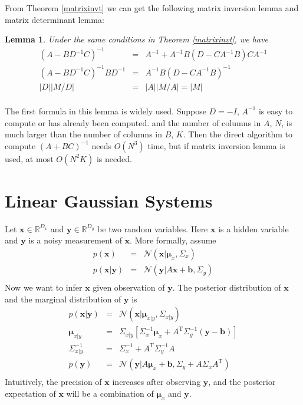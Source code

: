 \documentclass[openany]{book}
\newtheorem{lemma}{Lemma}[chapter]
\begin{document}
From Theorem \ref{matrixinvt} we can get the following matrix inversion lemma and matrix determinant lemma:
\begin{lemma}\label{matrixinvl}
Under the same conditions in Theorem \ref{matrixinvt}, we have
\begin{equation}
\begin{array}{rcl}
(A-BD^{-1}C)^{-1} & = & A^{-1}+A^{-1}B(D-CA^{-1}B)CA^{-1} \\
(A-BD^{-1}C)^{-1}BD^{-1} & = & A^{-1}B(D-CA^{-1}B)^{-1} \\
|D||M/D| & = & |A||M/A|=|M| \\
\end{array}
\end{equation}
\end{lemma}
The first formula in this lemma is widely used. Suppose $D=-I$, $A^{-1}$ is easy to compute or has already been computed. and the number of columns in $A$, $N$, is much larger than the number of columns in $B$, $K$. Then the direct algorithm to compute $(A+BC)^{-1}$ needs $O(N^3)$ time, but if matrix inversion lemma is used, at most $O(N^2K)$ is needed.

\section{Linear Gaussian Systems}
Let $\mathbf{x}\in\mathbb{R}^{D_x}$ and $\mathbf{y}\in\mathbb{R}^{D_y}$ be two random variables. Here $\mathbf{x}$ is a hidden variable and $\mathbf{y}$ is a noisy measurement of $\mathbf{x}$. More formally, assume
\begin{equation}\label{linGauss}
\begin{array}{rcl}
p(\mathbf{x}) & = & \mathcal{N}(\mathbf{x}|\boldsymbol{\mu}_x,\Sigma_x) \\
p(\mathbf{x}|\mathbf{y}) & = & \mathcal{N}(\mathbf{y}|A\mathbf{x}+\mathbf{b}, \Sigma_y) \\
\end{array}
\end{equation}
Now we want to infer $\mathbf{x}$ given observation of $\mathbf{y}$. The posterior distribution of $\mathbf{x}$ and the marginal distribution of $\mathbf{y}$ is
\begin{equation}\label{linGausspost}
\begin{array}{rcl}
p(\mathbf{x}|\mathbf{y}) & = & \mathcal{N}(\mathbf{x}|\boldsymbol{\mu}_{x|y},\Sigma_{x|y}) \\
\boldsymbol{\mu}_{x|y} & = & \Sigma_{x|y}[\Sigma_x^{-1}\boldsymbol{\mu}_x+A^{\mathrm{T}}\Sigma_y^{-1}(\mathbf{y}-\mathbf{b})] \\
\Sigma_{x|y}^{-1} & = & \Sigma_x^{-1}+A^{\mathrm{T}}\Sigma_y^{-1}A \\
p(\mathbf{y}) & = & \mathcal{N}(\mathbf{y}|A\boldsymbol{\mu}_x+\mathbf{b},\Sigma_y+A\Sigma_xA^{\mathrm{T}})\\
\end{array}
\end{equation}
Intuitively, the precision of $\mathbf{x}$ increases after observing $\mathbf{y}$, and the posterior expectation of $\mathbf{x}$ will be a combination of $\boldsymbol{\mu}_x$ and $\mathbf{y}$.
\end{document}
